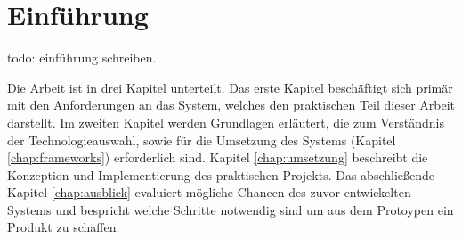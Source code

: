 
\chapter{Einführung}
\label{chap:introduction}

todo: einführung schreiben.

Die Arbeit ist in drei Kapitel unterteilt. Das erste Kapitel beschäftigt sich primär mit den
Anforderungen an das System, welches den praktischen Teil dieser Arbeit darstellt.
Im zweiten Kapitel werden Grundlagen erläutert, die zum Verständnis der Technologieauswahl,
sowie für die Umsetzung des Systems (Kapitel \ref{chap:frameworks}) erforderlich sind.
Kapitel \ref{chap:umsetzung} beschreibt die Konzeption und Implementierung des praktischen Projekts.
Das abschließende Kapitel \ref{chap:ausblick} evaluiert mögliche Chancen des zuvor entwickelten Systems und
bespricht welche Schritte notwendig sind um aus dem Protoypen ein Produkt zu schaffen.
